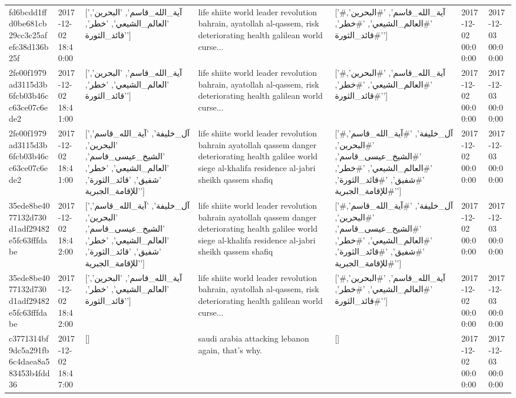 \begin{tabular}{lllllll}
fd6bcdd1ffd0be681cb29cc3c25afefc38d136b25f & 2017-12-02 18:40:00 & ['آية_الله_قاسم', 'البحرين', 'العالم_الشيعي', 'خطر', 'قائد_الثورة'] & life shiite world leader revolution bahrain, ayatollah al-qassem, risk deteriorating health galilean world curse... & ['#آية_الله_قاسم', '#البحرين', '#العالم_الشيعي', '#خطر', '#قائد_الثورة'] & 2017-12-02 00:00:00 & 2017-12-03 00:00:00 \\
2fe00f1979ad3115d3b6fcb03b46cc63ce07c6ede2 & 2017-12-02 18:41:00 & ['آية_الله_قاسم', 'البحرين', 'العالم_الشيعي', 'خطر', 'قائد_الثورة'] & life shiite world leader revolution bahrain, ayatollah al-qassem, risk deteriorating health galilean world curse... & ['#آية_الله_قاسم', '#البحرين', '#العالم_الشيعي', '#خطر', '#قائد_الثورة'] & 2017-12-02 00:00:00 & 2017-12-03 00:00:00 \\
2fe00f1979ad3115d3b6fcb03b46cc63ce07c6ede2 & 2017-12-02 18:41:00 & ['آل_خليفة', 'آية_الله_قاسم', 'البحرين', 'الشيخ_عيسى_قاسم', 'العالم_الشيعي', 'خطر', 'شفيق', 'قائد_الثورة', 'للإقامة_الجبرية'] & life shiite world leader revolution bahrain ayatollah qassem danger deteriorating health galilee world siege al-khalifa residence al-jabri sheikh qassem shafiq & ['#آل_خليفة', '#آية_الله_قاسم', '#البحرين', '#الشيخ_عيسى_قاسم', '#العالم_الشيعي', '#خطر', '#شفيق', '#قائد_الثورة', '#للإقامة_الجبرية'] & 2017-12-02 00:00:00 & 2017-12-03 00:00:00 \\
35ede8be4077132d730d1adf29482e5fc63fffdabe & 2017-12-02 18:42:00 & ['آل_خليفة', 'آية_الله_قاسم', 'البحرين', 'الشيخ_عيسى_قاسم', 'العالم_الشيعي', 'خطر', 'شفيق', 'قائد_الثورة', 'للإقامة_الجبرية'] & life shiite world leader revolution bahrain ayatollah qassem danger deteriorating health galilee world siege al-khalifa residence al-jabri sheikh qassem shafiq & ['#آل_خليفة', '#آية_الله_قاسم', '#البحرين', '#الشيخ_عيسى_قاسم', '#العالم_الشيعي', '#خطر', '#شفيق', '#قائد_الثورة', '#للإقامة_الجبرية'] & 2017-12-02 00:00:00 & 2017-12-03 00:00:00 \\
35ede8be4077132d730d1adf29482e5fc63fffdabe & 2017-12-02 18:42:00 & ['آية_الله_قاسم', 'البحرين', 'العالم_الشيعي', 'خطر', 'قائد_الثورة'] & life shiite world leader revolution bahrain, ayatollah al-qassem, risk deteriorating health galilean world curse... & ['#آية_الله_قاسم', '#البحرين', '#العالم_الشيعي', '#خطر', '#قائد_الثورة'] & 2017-12-02 00:00:00 & 2017-12-03 00:00:00 \\
c3771314bf9dc5a291fb6c4daea8a583453b4fdd36 & 2017-12-02 18:47:00 & [] & saudi arabia attacking lebanon again, that's why. & [] & 2017-12-02 00:00:00 & 2017-12-03 00:00:00 \\

\end{tabular}
